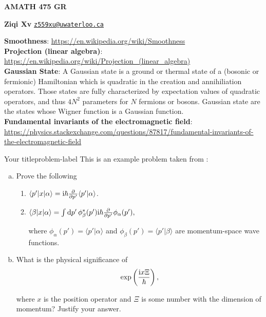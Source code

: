 





\begin{Large}
    \textsf{\textbf{AMATH 475 GR}}
    
\end{Large}

\vspace{1ex}

\textsf{\textbf{Ziqi Xv}}  \href{mailto:your.email@hotmail.com}{\texttt{z559xu@uwaterloo.ca}}



\textbf{Smoothness}:
\url{https://en.wikipedia.org/wiki/Smoothness}\\
\textbf{Projection (linear algebra)}: \url{https://en.wikipedia.org/wiki/Projection_(linear_algebra)}\\
\textbf{Gaussian State}:
A Gaussian state is a ground or thermal state of a (bosonic or fermionic) Hamiltonian which is quadratic in the creation and annihiliation operators. Those states are fully characterized by expectation values of quadratic operators, and thus $4N^2$
 parameters for $N$
 fermions or bosons. Gaussian state are the states whose Wigner function is a Gaussian function.\\
 \textbf{Fundamental invariants of the electromagnetic field}:
\url{https://physics.stackexchange.com/questions/87817/fundamental-invariants-of-the-electromagnetic-field}
\begin{problem}{Your title}{problem-label}
This is an example problem taken from \cite{Sakurai2020}:

\begin{enumerate}[(a)]
    \item Prove the following
    \begin{enumerate}[label = (\roman*)]
        \item $\langle p' | x | \alpha \rangle = \mathrm{i} \hbar \pdv{}{p'} \langle p' | \alpha \rangle$.

        \item $\langle \beta | x | \alpha \rangle = \int \dd{p'} \phi_{\beta}^{*} (p') \mathrm{i} \hbar \pdv{}{p'} \phi_{\alpha} (p'),$

        where $\phi_{\alpha}(p') = \langle p' | \alpha \rangle$ and $\phi_{\beta}(p') = \langle p' | \beta \rangle$ are momentum-space wave functions.
    \end{enumerate}

    \item What is the physical significance of 
    \[
    \exp\left(\dfrac{\mathrm{i} x \Xi}{\hbar}\right),
    \]

    where $x$ is the position operator and $\Xi$ is some number with the dimension of momentum? Justify your answer.
\end{enumerate}
\end{problem}

